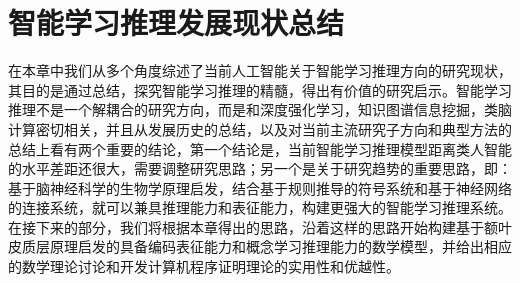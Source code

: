 \section{智能学习推理发展现状总结}
在本章中我们从多个角度综述了当前人工智能关于智能学习推理方向的研究现状，其目的是通过总结，探究智能学习推理的精髓，得出有价值的研究启示。智能学习推理不是一个解耦合的研究方向，而是和深度强化学习，知识图谱信息挖掘，类脑计算密切相关，并且从发展历史的总结，以及对当前主流研究子方向和典型方法的总结上看有两个重要的结论，第一个结论是，当前智能学习推理模型距离类人智能的水平差距还很大，需要调整研究思路；另一个是关于研究趋势的重要思路，即：基于脑神经科学的生物学原理启发，结合基于规则推导的符号系统和基于神经网络的连接系统，就可以兼具推理能力和表征能力，构建更强大的智能学习推理系统。在接下来的部分，我们将根据本章得出的思路，沿着这样的思路开始构建基于额叶皮质层原理启发的具备编码表征能力和概念学习推理能力的数学模型，并给出相应的数学理论讨论和开发计算机程序证明理论的实用性和优越性。
